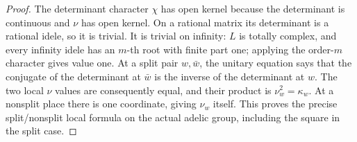 \begin{proof}
The determinant character $\chi$ has open kernel because the
determinant is continuous and $\nu$ has open kernel.  On a
rational matrix its determinant is a rational idele, so it is
trivial.  It is trivial on infinity: $L$ is totally complex,
and every infinity idele has an $m$-th root with finite part one;
applying the order-$m$ character gives value one.
At a split pair $w,\bar w$, the unitary equation says that the
conjugate of the determinant at $\bar w$ is the inverse of the
determinant at $w$.  The two local $\nu$ values are consequently
equal, and their product is $\nu_w^2=\kappa_w$.  At a nonsplit
place there is one coordinate, giving $\nu_w$ itself.
This proves the precise split/nonsplit local formula on the
actual adelic group, including the square in the split case.
\end{proof}

